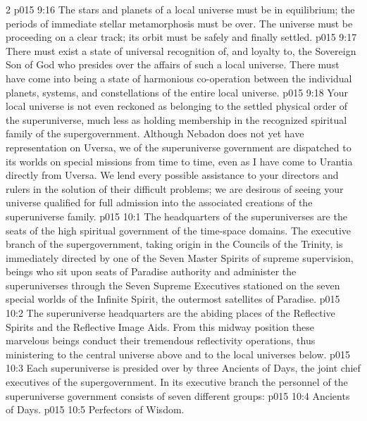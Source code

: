 \begin{multicols}{2}
\pc \vs p015 9:16 \bibnobreakspace {} The stars and planets of a local universe must be in equilibrium; the periods of immediate stellar metamorphosis must be over. The universe must be proceeding on a clear track; its orbit must be safely and finally settled.
\pc \vs p015 9:17 \bibnobreakspace {} There must exist a state of universal recognition of, and loyalty to, the Sovereign Son of God who presides over the affairs of such a local universe. There must have come into being a state of harmonious co\hyp{}operation between the individual planets, systems, and constellations of the entire local universe.
\pc \vs p015 9:18 Your local universe is not even reckoned as belonging to the settled physical order of the superuniverse, much less as holding membership in the recognized spiritual family of the supergovernment. Although Nebadon does not yet have representation on Uversa, we of the superuniverse government are dispatched to its worlds on special missions from time to time, even as I have come to Urantia directly from Uversa. We lend every possible assistance to your directors and rulers in the solution of their difficult problems; we are desirous of seeing your universe qualified for full admission into the associated creations of the superuniverse family.\plusone
{}
\vs p015 10:1 The headquarters of the superuniverses are the seats of the high spiritual government of the time\hyp{}space domains. The executive branch of the supergovernment, taking origin in the Councils of the Trinity, is immediately directed by one of the Seven Master Spirits of supreme supervision, beings who sit upon seats of Paradise authority and administer the superuniverses through the Seven Supreme Executives stationed on the seven special worlds of the Infinite Spirit, the outermost satellites of Paradise.\plusone
\vs p015 10:2 The superuniverse headquarters are the abiding places of the Reflective Spirits and the Reflective Image Aids. From this midway position these marvelous beings conduct their tremendous reflectivity operations, thus ministering to the central universe above and to the local universes below.
\pc \vs p015 10:3 Each superuniverse is presided over by three Ancients of Days, the joint chief executives of the supergovernment. In its executive branch the personnel of the superuniverse government consists of seven different groups:
\pc \vs p015 10:4 \bibnobreakspace Ancients of Days.
\vs p015 10:5 \bibnobreakspace Perfectors of Wisdom.

\end{multicols}
